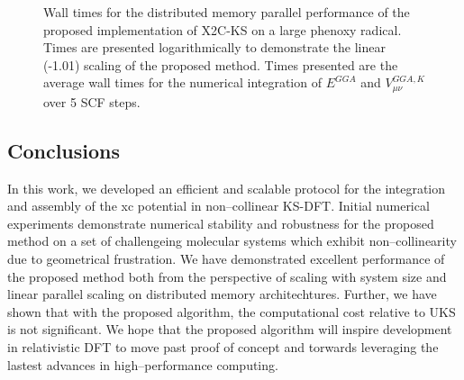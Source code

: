 \begin{figure}
\begin{center}
\end{center}
\caption{
Wall times for the distributed memory parallel performance of the proposed implementation of 
X2C-KS on a large phenoxy radical. Times are presented logarithmically to demonstrate the linear 
(-1.01) scaling of the proposed method.
Times presented are the average wall times for the numerical integration of
$E^{GGA}$ and $V_{\mu\nu}^{GGA,K}$ over 5 SCF steps.  
}
\label{fig:nodes}       
\end{figure}

\subsection{Conclusions}

In this work, we developed an efficient and scalable protocol for the
integration and assembly of the xc potential in non--collinear
KS-DFT. Initial numerical experiments demonstrate numerical stability
and robustness for the proposed method on a set of challengeing
molecular systems which exhibit non--collinearity due to geometrical
frustration. We have demonstrated excellent performance of
the proposed method both from the perspective of scaling with system
size and linear parallel scaling on distributed memory architechtures.
Further, we have shown that with the proposed algorithm, the computational 
cost relative to UKS is not significant. We hope that the proposed algorithm
will inspire development in relativistic DFT to move past proof of concept
and torwards leveraging the lastest advances in high--performance computing.




